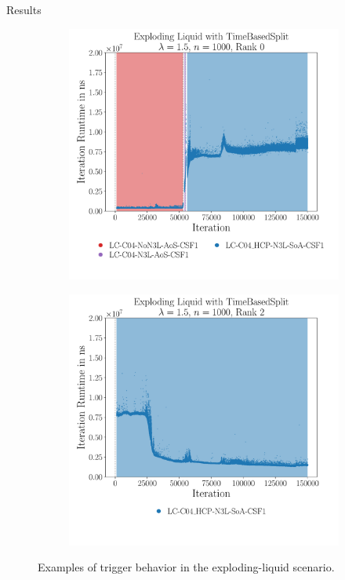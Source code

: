 \begin{frame}[c]{Results}{}
{\begin{figure}[htpb]
\begin{subfigure}[]{0.45\textwidth}
				\includegraphics[width=\textwidth]{plots/exploding-liquid_configs_good.pdf}
			\end{subfigure}%
			\begin{subfigure}[]{0.45\textwidth}
				\vskip 0pt
				\centering
				\includegraphics[width=\textwidth]{plots/exploding-liquid_configs_bad.pdf}
			\end{subfigure}
			\vspace{-0.5cm}
			\caption{Examples of trigger behavior in the exploding-liquid scenario.}
			\label{fig:expl_trigger_behavior}
		\end{figure}}
\end{frame}

